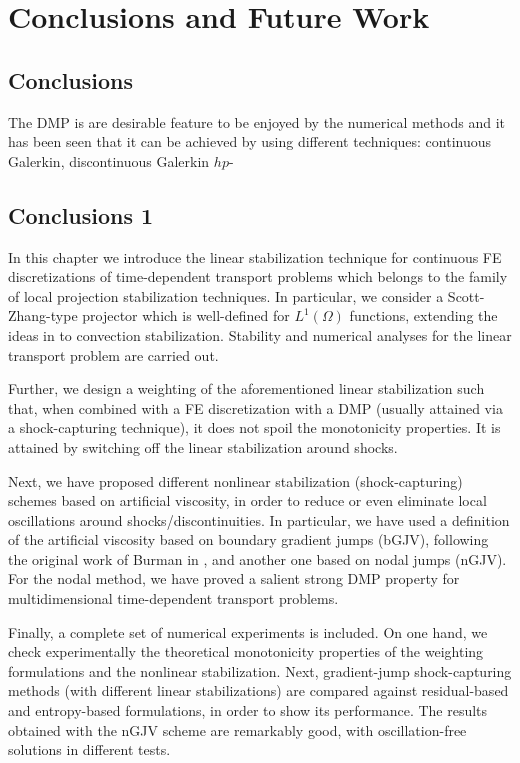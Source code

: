 \chapter{Conclusions and Future Work}

\section{Conclusions}

The DMP is are desirable feature to be enjoyed by the numerical methods and it has been seen that it can be achieved by using different techniques: continuous Galerkin, discontinuous Galerkin $hp$-

\section{Conclusions 1}
In this chapter we introduce the linear stabilization technique for continuous FE
discretizations of time-dependent transport problems which belongs to the family of local 
projection stabilization techniques. In particular, we consider a Scott-Zhang-type projector which is 
well-defined for $L^1(\Omega)$ functions, extending the ideas in \cite{badia_stabilized_2012} to convection stabilization. 
Stability and numerical analyses for the linear transport problem are carried out. 

Further, we design a weighting of the aforementioned linear stabilization such that, 
when combined with a FE discretization with a DMP (usually
attained via a shock-capturing technique), it does not spoil the monotonicity properties. 
It is attained by switching off the linear stabilization around shocks.

Next, we have proposed different nonlinear stabilization (shock-capturing) schemes based on 
artificial viscosity, in order to reduce or even eliminate local oscillations around shocks/discontinuities. 
In particular, we have used a definition of the artificial viscosity based on boundary gradient jumps (bGJV),
following the original work of Burman in \cite{burman_nonlinear_2007}, and another one based on
nodal jumps (nGJV). For the nodal method, we have proved a salient strong DMP property for multidimensional 
time-dependent transport problems.

Finally, a complete set of numerical experiments is included. On one hand, we check experimentally
the theoretical monotonicity properties of the weighting formulations and the nonlinear stabilization. Next, gradient-jump shock-capturing methods (with different linear stabilizations) are compared against residual-based and entropy-based formulations, in order to show its performance. The results obtained with the nGJV scheme are remarkably good, with oscillation-free solutions in different tests.

